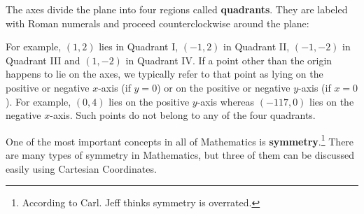\documentclass{ximera}
\begin{document}
The axes divide the plane into four regions called  \textbf{quadrants}.  They are labeled with Roman numerals and proceed counterclockwise around the plane:

\label{quadrant}

\begin{center}
\end{center}

For example, $(1,2)$ lies in Quadrant I, $(-1,2)$ in Quadrant II, $(-1,-2)$ in Quadrant III and $(1,-2)$ in Quadrant IV.  If a point other than the origin happens to lie on the axes, we typically refer to that point as lying on the positive or negative $x$-axis (if $y = 0$) or on the positive or negative $y$-axis (if $x = 0$).  For example, $(0,4)$ lies on the positive $y$-axis whereas $(-117,0)$ lies on the negative $x$-axis.  Such points do not belong to any of the four quadrants.

 

One of the most important concepts in all of Mathematics is \textbf{symmetry}.\footnote{According to Carl.  Jeff thinks symmetry is overrated.}  There are many types of symmetry in Mathematics, but three of them can be discussed easily using Cartesian Coordinates.

 


% 
\end{document}
